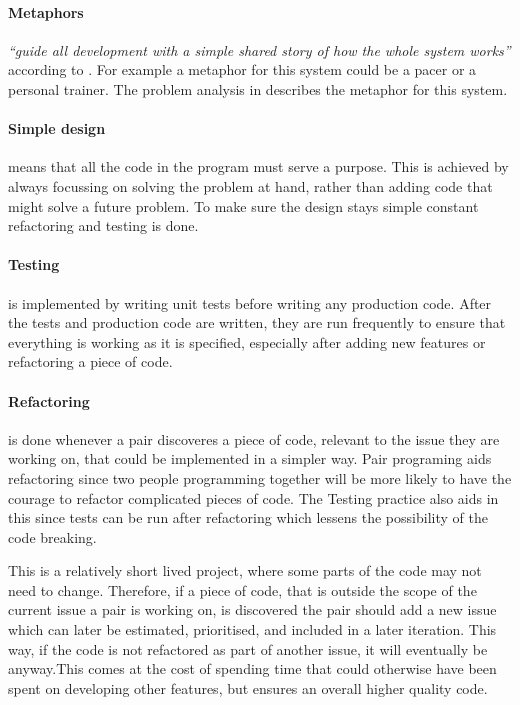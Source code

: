\paragraph{Metaphors} \textit{``guide all development with a simple shared story of how the whole system works''} according to \citet[p.54]{xp:planning}. For example a metaphor for this system could be a pacer or a personal trainer. The problem analysis in  describes the metaphor for this system.

\paragraph{Simple design} means that all the code in the program must serve a purpose. This is achieved by always focussing on solving the problem at hand, rather than adding code that might solve a future problem. To make sure the design stays simple constant refactoring and testing is done.

\paragraph{Testing} is implemented by writing unit tests before writing any production code. After the tests and production code are written, they are run frequently to ensure that everything is working as it is specified, especially after adding new features or refactoring a piece of code.

\paragraph{Refactoring} is done whenever a pair discoveres a piece of code, relevant to the issue they are working on, that could be implemented in a simpler way. Pair programing aids refactoring since two people programming together will be more likely to have the courage to refactor complicated pieces of code. The Testing practice also aids in this since tests can be run after refactoring which lessens the possibility of the code breaking.

This is a relatively short lived project, where some parts of the code may not need to change. Therefore, if a piece of code, that is outside the scope of the current issue a pair is working on, is discovered the pair should add a new issue which can later be estimated, prioritised, and included in a later iteration. This way, if the code is not refactored as part of another issue, it will eventually be anyway.This comes at the cost of spending time that could otherwise have been spent on developing other features, but ensures an overall higher quality code. 

